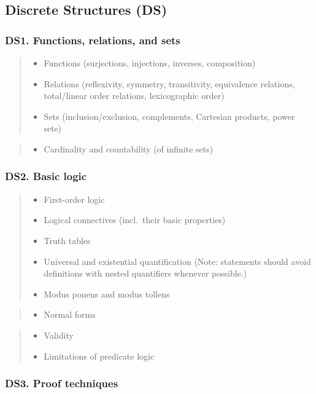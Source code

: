 \documentclass[a4paper,11pt,oneside]{article}
\newcommand{\cmark}{\ding{51}}%
\newcommand{\xmark}{\ding{55}}%
\newcommand{\CC}[1]{#1}
\newcommand{\cincl}{{\small\cmark}}
\newcommand{\cdefi}{{\small\cmark\faFileTextO}}
\newcommand{\ccode}{{\small\cmark\faFileText}}
\newcommand{\cnfoc}{{\small\faQuestion}}
\newcommand{\cexcl}{{\small\xmark}}
\newcommand{\Iincluded}{\item[\hbox to 1.8em{\cincl\hfill}]}
\newcommand{\Idefine}{\item[\hbox to 1.8em{\cdefi\hfill}]}
\newcommand{\Icodeonly}{\item[\hbox to 1.8em{\ccode\hfill}]}
\newcommand{\Inofocus}{\item[\hbox to 1.8em{\cnfoc\hfill}]}
\newcommand{\Iexcluded}{\item[\hbox to 1.8em{\cexcl\hfill}]}
\newenvironment{myitemize}{\begin{quote}\begin{itemize}\itemsep 0pt}{\end{itemize}\end{quote}}
\begin{document}
\subsection {Discrete Structures (DS)}%
\label{subsubsec:DS}

    \subsubsection*{DS1. Functions, relations, and sets}

        \begin{myitemize}
        \Idefine\CC{Functions (surjections, injections, inverses, composition)}
        \Idefine\CC{Relations (reflexivity, symmetry, transitivity, equivalence relations,
        total/linear order relations, lexicographic order)}
        \Idefine\CC{Sets (inclusion/exclusion, complements, Cartesian products, power sets)}
        \end{myitemize}

        \begin{myitemize}
        \Iexcluded{Cardinality and countability} (of infinite sets)
        \end{myitemize}
  
    \subsubsection*{DS2. Basic logic}

        \begin{myitemize}
        \Iincluded First-order logic
        \Iincluded\CC{Logical connectives} (incl.\ their basic properties)
        \Iincluded\CC{Truth tables}
        \Iincluded\CC{Universal and existential quantification} (Note: statements should avoid definitions with nested quantifiers whenever possible.)
        \Icodeonly\CC{Modus ponens and modus tollens}
        \end{myitemize}

        \begin{myitemize}
        \Inofocus \CC{Normal forms}
        \end{myitemize}
        
        \begin{myitemize}
        \Iexcluded \CC{Validity}
        \Iexcluded \CC{Limitations of predicate logic}
        \end{myitemize}

    \subsubsection*{DS3. Proof techniques}
\end{document}
